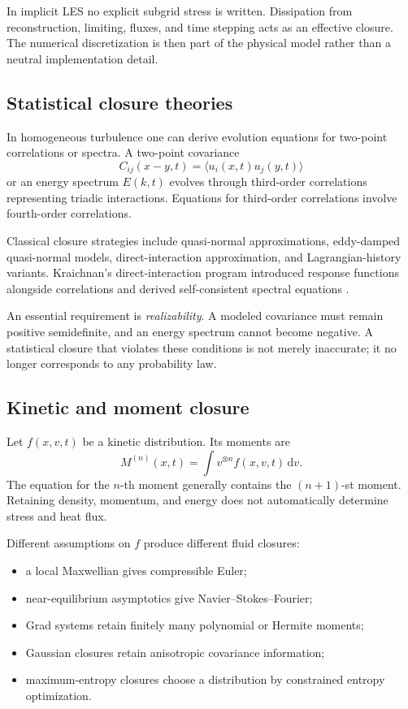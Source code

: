 \documentclass[11pt]{article}
\newcommand{\dd}{\,\mathrm{d}}
\begin{document}
In implicit LES no explicit subgrid stress is written. Dissipation from reconstruction, limiting, fluxes, and time stepping acts as an effective closure. The numerical discretization is then part of the physical model rather than a neutral implementation detail.

\subsection{Statistical closure theories}

In homogeneous turbulence one can derive evolution equations for two-point correlations or spectra. A two-point covariance
\[
C_{ij}(x-y,t)=\langle u_i(x,t)u_j(y,t)\rangle
\]
or an energy spectrum \(E(k,t)\) evolves through third-order correlations representing triadic interactions. Equations for third-order correlations involve fourth-order correlations.

Classical closure strategies include quasi-normal approximations, eddy-damped quasi-normal models, direct-interaction approximation, and Lagrangian-history variants. Kraichnan's direct-interaction program introduced response functions alongside correlations and derived self-consistent spectral equations \citep{kraichnan1959structure}.

An essential requirement is \emph{realizability}. A modeled covariance must remain positive semidefinite, and an energy spectrum cannot become negative. A statistical closure that violates these conditions is not merely inaccurate; it no longer corresponds to any probability law.

\subsection{Kinetic and moment closure}

Let \(f(x,v,t)\) be a kinetic distribution. Its moments are
\begin{equation}
M^{(n)}(x,t)=\int v^{\otimes n}f(x,v,t)\dd v.
\end{equation}
The equation for the \(n\)-th moment generally contains the \((n+1)\)-st moment. Retaining density, momentum, and energy does not automatically determine stress and heat flux.

Different assumptions on \(f\) produce different fluid closures:
\begin{itemize}
  \item a local Maxwellian gives compressible Euler;
  \item near-equilibrium asymptotics give Navier--Stokes--Fourier;
  \item Grad systems retain finitely many polynomial or Hermite moments;
  \item Gaussian closures retain anisotropic covariance information;
  \item maximum-entropy closures choose a distribution by constrained entropy optimization.
\end{itemize}
\end{document}

